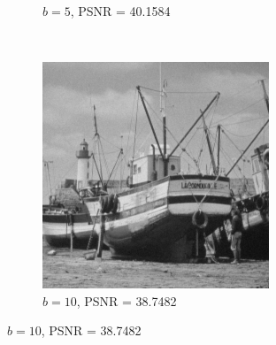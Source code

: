 \documentclass{article}
\begin{document}
\begin{enumerate}[label=(\alph*)]
\begin{figure}[!htb]
\begin{subfigure}[b]{0.3\textwidth}
            \caption{$b = 5$, PSNR = 40.1584}
        \end{subfigure}
        ~
        \begin{subfigure}[b]{0.3\textwidth}
            \includegraphics[width=\textwidth]{img/RG10.png}
            \caption{$b = 10$, PSNR = 38.7482}
        \end{subfigure}
        



\end{figure}
\end{enumerate}
\end{document}
